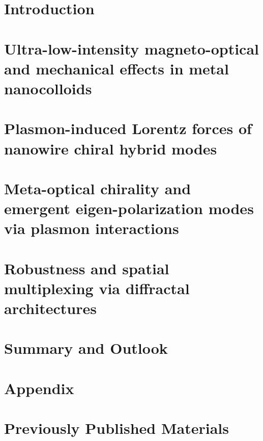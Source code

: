 \documentclass[letterpaper, 12pt, oneside]{book}
\begin{document}
 
\printnomenclature



\mainmatter

\chapter{Introduction}

\clearpage

\chapter{Ultra-low-intensity magneto-optical and mechanical effects in metal nanocolloids}

\clearpage

\chapter{Plasmon-induced Lorentz forces of nanowire chiral hybrid modes}

\clearpage

\chapter{Meta-optical chirality and emergent eigen-polarization modes via plasmon interactions}

\clearpage

\chapter{Robustness and spatial multiplexing via diffractal architectures}

\clearpage

\chapter{Summary and Outlook}


\chapter{Appendix}


\chapter*{Previously Published Materials}
\label{chap:ppm}



\clearpage
\clearpage


\singlespacing


\end{document}
